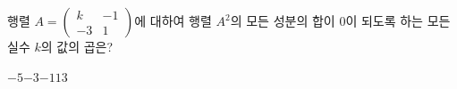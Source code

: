 \hspace*{2mm}\begin{minipage}[t]{\dimexpr\linewidth-2mm\relax}\vspace{0pt}
행렬 $A=\begin{pmatrix} k & -1 \\ -3 & 1 \end{pmatrix}$에 대하여 행렬 $A^2$의 모든 성분의 합이 $0$이 되도록 하는 모든 실수 $k$의 값의 곱은?
\begin{choices32}{$-5$}{$-3$}{$-1$}{$1$}{$3$}\end{choices32}\end{minipage}
